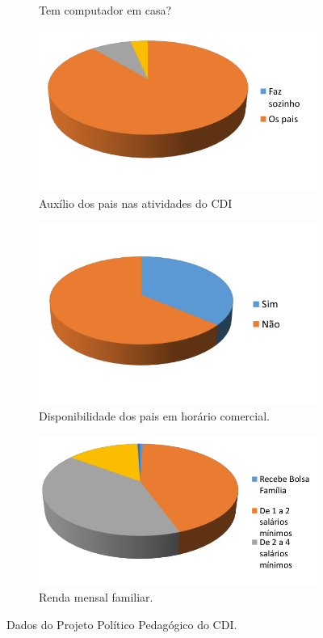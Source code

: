 \begin{figure}[!htbp]
\begin{subfigure}{.3\textwidth}
        \caption{Tem computador em casa?}
        \label{fig:tem_computador}
    \end{subfigure}
    \begin{subfigure}{.3\textwidth}
        \includegraphics[width=.9\linewidth,fbox]{figs/cdi/pai_auxilia_crianca_atividades.png}
        \caption{Auxílio dos pais nas atividades do CDI}
        \label{fig:pai_auxilia_crianca_atividades}
    \end{subfigure}%
    \begin{subfigure}{.3\textwidth}
        \includegraphics[width=.9\linewidth,fbox]{figs/cdi/disponibilidade_pais_horario_comercial.png}
        \caption{Disponibilidade dos pais em horário comercial.}
        \label{fig:disponibilidade_pais_horario_comercial}
    \end{subfigure}%
     \begin{subfigure}{.3\textwidth}
        \includegraphics[width=.9\linewidth,fbox]{figs/cdi/renda.png}
        \caption{Renda mensal familiar.}
        \label{fig:renda}
    \end{subfigure}%
    \caption{Dados do Projeto Político Pedagógico do CDI.}
    \label{fig:contexto_ppp}
\end{figure}
